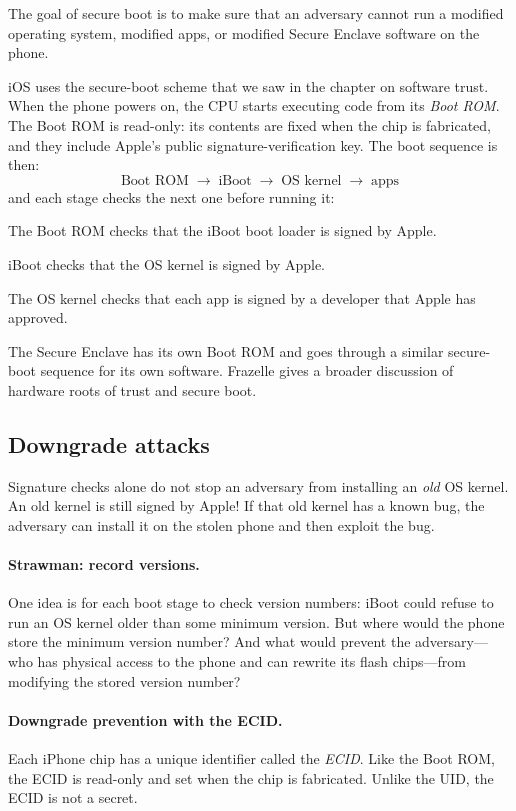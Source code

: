 The goal of secure boot is to make sure that an adversary cannot run a
modified operating system, modified apps, or modified Secure Enclave
software on the phone.

iOS uses the secure-boot scheme that we saw in the chapter on software
trust.
When the phone powers on, the CPU starts executing code from its
\emph{Boot ROM}.
The Boot ROM is read-only: its contents are fixed when the chip is
fabricated, and they include Apple's public signature-verification key.
The boot sequence is then:
\[
  \text{Boot ROM} \;\to\; \text{iBoot} \;\to\; \text{OS kernel} \;\to\; \text{apps}
\]
and each stage checks the next one before running it:
\begin{compactitem}
  \item The Boot ROM checks that the iBoot boot loader is signed by Apple.
  \item iBoot checks that the OS kernel is signed by Apple.
  \item The OS kernel checks that each app is signed by a developer that
        Apple has approved.
\end{compactitem}
The Secure Enclave has its own Boot ROM and goes through a similar
secure-boot sequence for its own software.
Frazelle gives a broader discussion of hardware roots of trust and
secure boot.\autocite{frazelle:boot}

\subsection{Downgrade attacks}

Signature checks alone do not stop an adversary from installing an
\emph{old} OS kernel.
An old kernel is still signed by Apple!
If that old kernel has a known bug, the adversary can install it on the
stolen phone and then exploit the bug.

\paragraph{Strawman: record versions.}
One idea is for each boot stage to check version numbers: iBoot could
refuse to run an OS kernel older than some minimum version.
But where would the phone store the minimum version number?
And what would prevent the adversary---who has physical access to the
phone and can rewrite its flash chips---from modifying the stored
version number?

\paragraph{Downgrade prevention with the ECID.}
Each iPhone chip has a unique identifier called the \emph{ECID}.
Like the Boot ROM, the ECID is read-only and set when the chip is
fabricated.
Unlike the UID, the ECID is not a secret.

